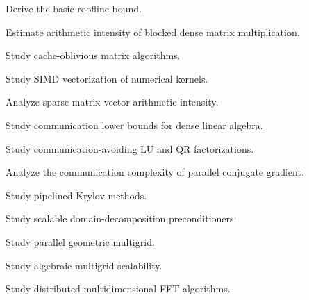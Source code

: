 \begin{exercise}[4]
Derive the basic roofline bound.
\end{exercise}

\begin{exercise}[4]
Estimate arithmetic intensity of blocked dense matrix multiplication.
\end{exercise}

\begin{exercise}[4]
Study cache-oblivious matrix algorithms.
\end{exercise}

\begin{exercise}[4]
Study SIMD vectorization of numerical kernels.
\end{exercise}

\begin{exercise}[4]
Analyze sparse matrix-vector arithmetic intensity.
\end{exercise}

\begin{exercise}[4]
Study communication lower bounds for dense linear algebra.
\end{exercise}

\begin{exercise}[4]
Study communication-avoiding LU and QR factorizations.
\end{exercise}

\begin{exercise}[4]
Analyze the communication complexity of parallel conjugate gradient.
\end{exercise}

\begin{exercise}[4]
Study pipelined Krylov methods.
\end{exercise}

\begin{exercise}[4]
Study scalable domain-decomposition preconditioners.
\end{exercise}

\begin{exercise}[4]
Study parallel geometric multigrid.
\end{exercise}

\begin{exercise}[4]
Study algebraic multigrid scalability.
\end{exercise}

\begin{exercise}[4]
Study distributed multidimensional FFT algorithms.
\end{exercise}

